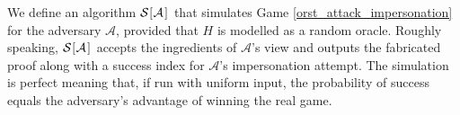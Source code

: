 \documentclass[10pt, psamsfonts, reqno]{amsart}
\theoremstyle{definition}
\theoremstyle{remark}
\numberwithin{equation}{section}
\begin{document}
We define an algorithm
$
\mathcal{S}
		\hspace{.5pt}
		[
			\hspace{0.5pt}
			\mathcal{A}
			\hspace{1pt}
		]
		\hspace{0.5pt}
$
that simulates Game \ref{orst_attack_impersonation}
for the adversary $\mathcal{A}$,
provided that $H$ is modelled as a random oracle.
Roughly speaking,
$
\mathcal{S}
		\hspace{.5pt}
		[
			\hspace{0.5pt}
			\mathcal{A}
			\hspace{1pt}
		]
		\hspace{0.5pt}
$
accepts
the ingredients of $\mathcal{A}$'s view and outputs
the fabricated proof along with
a success index for $\mathcal{A}$'s impersonation attempt.
The simulation is perfect meaning that,
if run with uniform input,
the probability of success equals
the adversary's advantage of
winning the real game.
\end{document}
